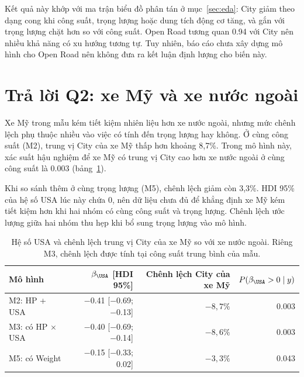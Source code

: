\documentclass[12pt,a4paper]{report}
\begin{document}
Kết quả này khớp với ma trận biểu đồ phân tán ở mục~\ref{sec:eda}: City giảm
theo dạng cong khi công suất, trọng lượng hoặc dung tích động cơ tăng, và gắn
với trọng lượng chặt hơn so với công suất. Open Road tương quan \num{0.94} với
City nên nhiều khả năng có xu hướng tương tự. Tuy nhiên, báo cáo chưa xây dựng mô hình cho Open Road nên không đưa
ra kết luận định lượng cho biến này.


\section{Trả lời Q2: xe Mỹ và xe nước ngoài}
\label{sec:q2}

Xe Mỹ trong mẫu kém tiết kiệm nhiên liệu hơn xe nước ngoài, nhưng mức chênh
lệch phụ thuộc nhiều vào việc có tính đến trọng lượng hay không. Ở cùng công
suất (M2), trung vị City của xe Mỹ thấp hơn khoảng 8{,}7\%. Trong mô hình này,
xác suất hậu nghiệm để xe Mỹ có trung vị City cao hơn xe nước ngoài ở cùng
công suất là \num{0.003} (bảng~\ref{tab:q2}).

Khi so sánh thêm ở cùng trọng lượng (M5), chênh lệch giảm còn 3{,}3\%. HDI 95\%
của hệ số USA lúc này chứa 0, nên dữ liệu chưa đủ để khẳng định xe Mỹ kém tiết
kiệm hơn khi hai nhóm có cùng công suất và trọng lượng. Chênh lệch ước lượng
giữa hai nhóm thu hẹp khi bổ sung trọng lượng vào mô hình.

\begin{table}[tp]
  \centering
  \caption{Hệ số USA và chênh lệch trung vị City của xe Mỹ so với xe nước ngoài.
    Riêng M3, chênh lệch được tính tại công suất trung bình của mẫu.}
  \label{tab:q2}
  \begin{tabular}{lrrr}
    \toprule
    Mô hình & $\beta_{\USA}$ [HDI 95\%] & Chênh lệch City của xe Mỹ & $P(\beta_{\USA} > 0 \mid y)$ \\
    \midrule
    M2: HP + USA         & \num{-0.41} [\num{-0.69}; \num{-0.13}] & $-8{,}7\%$ & \num{0.003} \\
    M3: có HP $\times$ USA & \num{-0.40} [\num{-0.69}; \num{-0.14}] & $-8{,}6\%$ & \num{0.003} \\
    M5: có Weight        & \num{-0.15} [\num{-0.33}; \num{0.02}]  & $-3{,}3\%$ & \num{0.043} \\
    \bottomrule
  \end{tabular}
\end{table}
\end{document}
